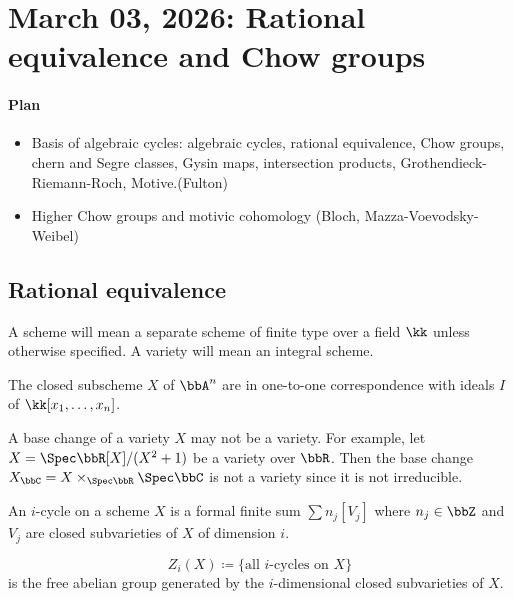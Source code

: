 \section{March 03, 2026: Rational equivalence and Chow groups}

\paragraph{Plan}
\begin{itemize}
    \item [I] Basis of algebraic cycles:
    algebraic cycles, rational equivalence, Chow groups, chern and Segre classes, Gysin maps, intersection products, Grothendieck-Riemann-Roch, Motive.(Fulton)
    \item[II] Higher Chow groups and motivic cohomology (Bloch, Mazza-Voevodsky-Weibel)
\end{itemize}

\subsection{Rational equivalence}

    A scheme will mean a separate scheme of finite type over a field \(\kk\) unless otherwise specified. 
    A variety will mean an integral scheme.

    \begin{example}
        The closed subscheme \(X\) of \(\bbA^n\) are in one-to-one correspondence with ideals \(I\) of \(\kk[x_1,\dots,x_n]\).
    \end{example}

    \begin{example}
        A base change of a variety \(X\) may not be a variety. 
        For example, let \(X = \Spec \bbR[X]/(X^2+1)\) be a variety over \(\bbR\). 
        Then the base change \(X_{\bbC} = X \times_{\Spec \bbR} \Spec \bbC\) is not a variety since it is not irreducible.
    \end{example}

    \begin{definition}
        An \(i\)-cycle on a scheme \(X\) is a formal finite sum \(\sum n_j [V_j]\) where \(n_j \in \bbZ\) and \(V_j\) are closed subvarieties of \(X\) of dimension \(i\).
    \end{definition}

    \begin{definition}
        \[ Z_i(X) \coloneqq \{\text{all } i\text{-cycles on } X\} \]
        is the free abelian group generated by the \(i\)-dimensional closed subvarieties of \(X\).
    \end{definition}

